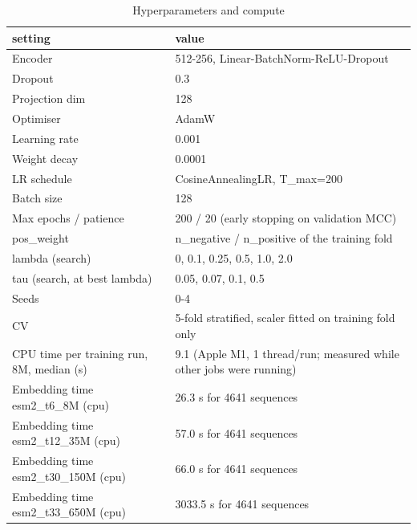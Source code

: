 \begin{table}[ht]
\centering\small
\caption{Hyperparameters and compute}
\label{tab:T4_1_hyperparameters}
\begin{tabular}{ll}
\hline
setting & value \\
\hline
Encoder & 512-256, Linear-BatchNorm-ReLU-Dropout \\
Dropout & 0.3 \\
Projection dim & 128 \\
Optimiser & AdamW \\
Learning rate & 0.001 \\
Weight decay & 0.0001 \\
LR schedule & CosineAnnealingLR, T\_max=200 \\
Batch size & 128 \\
Max epochs / patience & 200 / 20 (early stopping on validation MCC) \\
pos\_weight & n\_negative / n\_positive of the training fold \\
lambda (search) & 0, 0.1, 0.25, 0.5, 1.0, 2.0 \\
tau (search, at best lambda) & 0.05, 0.07, 0.1, 0.5 \\
Seeds & 0-4 \\
CV & 5-fold stratified, scaler fitted on training fold only \\
CPU time per training run, 8M, median (s) & 9.1 (Apple M1, 1 thread/run; measured while other jobs were running) \\
Embedding time esm2\_t6\_8M (cpu) & 26.3 s for 4641 sequences \\
Embedding time esm2\_t12\_35M (cpu) & 57.0 s for 4641 sequences \\
Embedding time esm2\_t30\_150M (cpu) & 66.0 s for 4641 sequences \\
Embedding time esm2\_t33\_650M (cpu) & 3033.5 s for 4641 sequences \\
\hline
\end{tabular}
\end{table}
